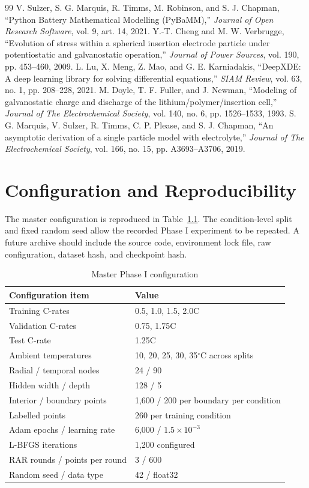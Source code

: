 \documentclass[14pt,a4paper,oneside]{extreport}
\renewcommand{\arraystretch}{1.25}
\begin{document}
\begin{thebibliography}{99}
 V. Sulzer, S. G. Marquis, R. Timms, M. Robinson, and S. J. Chapman, ``Python Battery Mathematical Modelling (PyBaMM),'' \emph{Journal of Open Research Software}, vol. 9, art. 14, 2021.
 Y.-T. Cheng and M. W. Verbrugge, ``Evolution of stress within a spherical insertion electrode particle under potentiostatic and galvanostatic operation,'' \emph{Journal of Power Sources}, vol. 190, pp. 453--460, 2009.
 L. Lu, X. Meng, Z. Mao, and G. E. Karniadakis, ``DeepXDE: A deep learning library for solving differential equations,'' \emph{SIAM Review}, vol. 63, no. 1, pp. 208--228, 2021.
 M. Doyle, T. F. Fuller, and J. Newman, ``Modeling of galvanostatic charge and discharge of the lithium/polymer/insertion cell,'' \emph{Journal of The Electrochemical Society}, vol. 140, no. 6, pp. 1526--1533, 1993.
 S. G. Marquis, V. Sulzer, R. Timms, C. P. Please, and S. J. Chapman, ``An asymptotic derivation of a single particle model with electrolyte,'' \emph{Journal of The Electrochemical Society}, vol. 166, no. 15, pp. A3693--A3706, 2019.
\end{thebibliography}
\endgroup

\appendix
\chapter{Configuration and Reproducibility}
The master configuration is reproduced in Table~\ref{tab:appendixconfig}. The condition-level split and fixed random seed allow the recorded Phase I experiment to be repeated. A future archive should include the source code, environment lock file, raw configuration, dataset hash, and checkpoint hash.

\begingroup
\renewcommand{\arraystretch}{1.0}
\begin{longtable}{p{}p{}}
\caption{Master Phase I configuration}\label{tab:appendixconfig}\\
\toprule
Configuration item & Value\\
\midrule
Training C-rates & 0.5, 1.0, 1.5, 2.0C\\
Validation C-rates & 0.75, 1.75C\\
Test C-rate & 1.25C\\
Ambient temperatures & 10, 20, 25, 30, 35$^{\circ}$C across splits\\
Radial / temporal nodes & 24 / 90\\
Hidden width / depth & 128 / 5\\
Interior / boundary points & 1,600 / 200 per boundary per condition\\
Labelled points & 260 per training condition\\
Adam epochs / learning rate & 6,000 / $1.5\times10^{-3}$\\
L-BFGS iterations & 1,200 configured\\
RAR rounds / points per round & 3 / 600\\
Random seed / data type & 42 / float32\\
\bottomrule
\end{longtable}
\endgroup
\end{document}

